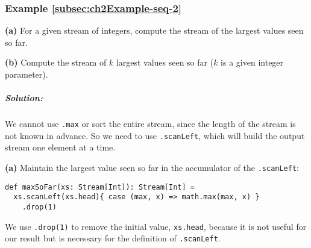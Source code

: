\subsubsection{Example \label{subsec:ch2Example-seq-2}\ref{subsec:ch2Example-seq-2}}

\textbf{(a)} For a given stream of integers, compute the stream of
the largest values seen so far.

\textbf{(b)} Compute the stream of $k$ largest values seen so far
($k$ is a given integer parameter).

\subparagraph{Solution:}

We cannot use \lstinline!.max!
or sort the entire stream, since the length of the stream is not known
in advance. So we need to use \lstinline!.scanLeft!,
which will build the output stream one element at a time.

\textbf{(a)} Maintain the largest value seen so far in the accumulator
of the \lstinline!.scanLeft!:
\begin{lstlisting}
def maxSoFar(xs: Stream[Int]): Stream[Int] =
  xs.scanLeft(xs.head){ case (max, x) => math.max(max, x) }
    .drop(1)
\end{lstlisting}
We use \lstinline!.drop(1)!
to remove the initial value, \lstinline!xs.head!,
because it is not useful for our result but is necessary for the definition
of \lstinline!.scanLeft!.

